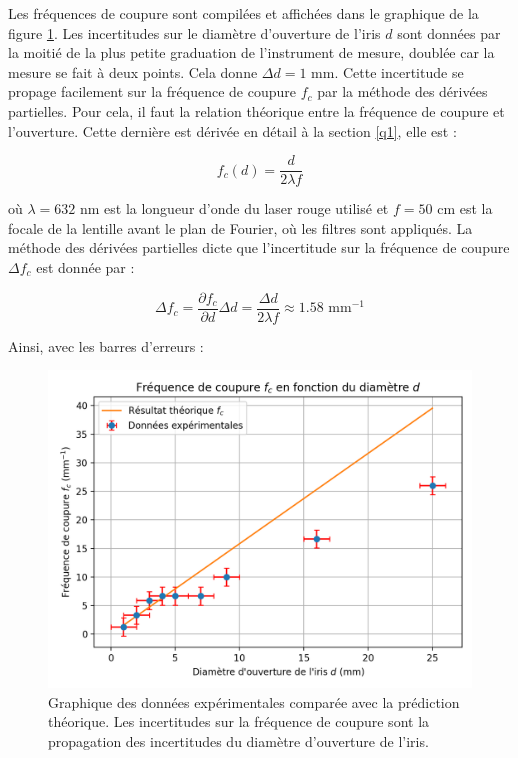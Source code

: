 \documentclass[11pt,letterpaper]{article}
\begin{document}
Les fréquences de coupure sont compilées et affichées dans le graphique de la figure \ref{plot}. Les incertitudes sur
le diamètre d'ouverture de l'iris $d$ sont données par la moitié de la plus petite graduation de l'instrument de mesure,
doublée car la mesure se fait à deux points. Cela donne $\Delta d = 1$ mm. Cette incertitude se propage facilement sur
la fréquence de coupure $f_c$  par la méthode des dérivées partielles. Pour cela, il faut la relation théorique entre la
fréquence de coupure et l'ouverture. Cette dernière est dérivée en détail à la section \ref{q1}, elle est :

\begin{equation}
  f_c(d)= \frac{d}{2\lambda f}
  \label{eqfcoup}
\end{equation}

où $\lambda = 632$ nm est la longueur d'onde du laser rouge utilisé et $f = 50$ cm est la focale de la lentille avant le
plan de Fourier, où les filtres sont appliqués. La méthode des dérivées partielles dicte que l'incertitude sur la
fréquence de coupure $\Delta f_c$ est donnée par :

\begin{equation}
  \Delta f_c = \frac{\partial f_c}{\partial d}\Delta d = \frac{\Delta d}{2 \lambda f} \approx 1.58 \text{ mm}^{-1} 
\end{equation}

Ainsi, avec les barres d'erreurs :

\begin{figure}[H]
  \centering
  \includegraphics[scale=0.9]{graph_fc.png}
  \caption{Graphique des données expérimentales comparée avec la prédiction théorique. Les incertitudes sur la fréquence
  de coupure sont la propagation des incertitudes du diamètre d'ouverture de l'iris.}
  \label{plot}
\end{figure}
\end{document}
